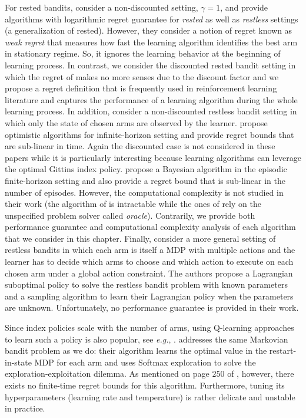 For rested bandits, \cite{tekin2012online} consider a non-discounted setting, $\gamma=1$, and provide algorithms with logarithmic regret guarantee for \emph{rested}  as well as  \emph{restless} settings (a generalization of rested).
However, they consider a notion of regret known as \emph{weak regret} that measures how fast the learning algorithm identifies the best arm in stationary regime. So, it ignores the learning behavior at the beginning of learning process.
In contrast, we consider the discounted rested bandit setting in which the regret of \cite{tekin2012online} makes no more senses due to the discount factor and we propose a regret definition that is frequently used in reinforcement learning literature and captures the performance of a learning algorithm during the whole learning process.
In addition, \cite{ortner2012regret, jung2019regret, wang2020restless} consider a non-discounted restless bandit setting in which only the state of chosen arms are observed by the learner. \cite{ortner2012regret, wang2020restless} propose optimistic algorithms for infinite-horizon setting and provide regret bounds that are sub-linear in time. Again the discounted case is not considered in these papers while it is particularly interesting  because learning algorithms can leverage the optimal Gittins index policy.
\cite{jung2019regret} propose a Bayesian algorithm in the episodic finite-horizon setting and also provide a regret bound that is sub-linear in the number of episodes. However, the computational complexity is not studied in their work (the algorithm of \cite{ortner2012regret} is intractable while the ones of \cite{jung2019regret, wang2020restless} rely on the unspecified problem solver called \emph{oracle}).
Contrarily, we provide both performance guarantee and computational complexity analysis of each algorithm that we consider in this chapter.
Finally, \cite{killian2021beyond} consider a more general setting of restless bandits in which each arm is itself a MDP with multiple actions and the learner has to decide which arms to choose and which action to execute on each chosen arm under a  global action constraint. The authors propose a Lagrangian suboptimal policy to solve the restless bandit problem with known parameters and a sampling algorithm to learn their Lagrangian policy when the parameters are unknown. Unfortunately, no performance guarantee is provided in their work.

Since index policies  scale with the number of arms, using Q-learning approaches
to learn such a policy is also popular, see \emph{e.g.},
\cite{avrachenkov2022whittle,fu2019towards,duff1995q}. \cite{duff1995q} addresses the same Markovian bandit
problem as we do: their algorithm learns the optimal value in the
restart-in-state MDP \cite{katehakis1987multi} for each
arm and uses Softmax exploration to solve the exploration-exploitation
dilemma. As mentioned on page $250$ of
\cite{auer2002finite}, however, there exists no
finite-time regret bounds for this algorithm. Furthermore, tuning
its hyperparameters (learning rate and temperature) is rather delicate and
unstable  in practice. 

